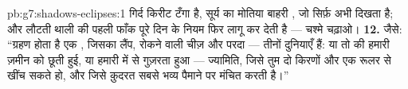 \begin{solution}{pb:g7:shadows-eclipses:1}
गिर्द किरीट टँगा है, सूर्य का मोतिया बाहरी , जो सिर्फ़ अभी
दिखता है; और लौटती थाली की पहली फाँक पूरे दिन के नियम फिर लागू कर देती
है --- चश्मे चढ़ाओ।
\textbf{12.} जैसे: ``ग्रहण होता है एक , जिसका लैंप, रोकने वाली
चीज़ और परदा --- तीनों दुनियाएँ हैं: या तो  की  हमारी
ज़मीन को छूती हुई, या  हमारी  में से गुज़रता हुआ ---
ज्यामिति, जिसे तुम दो किरणों और एक रूलर से खींच सकते हो, और जिसे
क़ुदरत सबसे भव्य पैमाने पर मंचित करती है।''
\end{solution}
